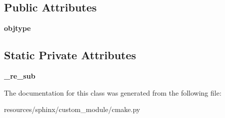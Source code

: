 \subsection*{Public Attributes}
\begin{DoxyCompactItemize}
\item 
\mbox{\label{classcmake_1_1CMakeObject_a8e5fc4c75fdfb8b88fcbe6c37678cba5}} 
{\bfseries objtype}
\end{DoxyCompactItemize}
\subsection*{Static Private Attributes}
\begin{DoxyCompactItemize}
\item 
\mbox{\label{classcmake_1_1CMakeObject_a4a5c13fecd7ac9c0433b126f37a5806c}} 
{\bfseries \+\_\+re\+\_\+sub}
\end{DoxyCompactItemize}


The documentation for this class was generated from the following file\+:\begin{DoxyCompactItemize}
\item 
resources/sphinx/custom\+\_\+module/cmake.\+py\end{DoxyCompactItemize}
